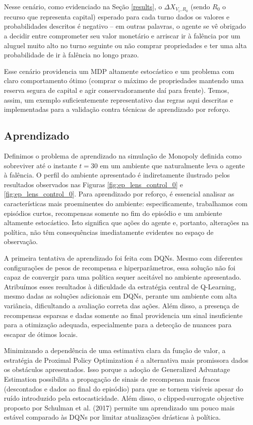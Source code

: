 \documentclass[conference]{IEEEtran}
\begin{document}
Nesse cenário, como evidenciado na Seção \ref{results}, o $\Delta X_{V_1,R_0}$ (sendo $R_0$ o recurso que representa capital) esperado para cada turno dados os valores e probabilidades descritos é negativo -- em outras palavras, o agente se vê obrigado a decidir entre comprometer seu valor monetário e arriscar ir à falência por um aluguel muito alto no turno seguinte ou não comprar propriedades e ter uma alta probabilidade de ir à falência no longo prazo.

Esse cenário providencia um MDP altamente estocástico e um problema com claro comportamento ótimo (comprar o máximo de propriedades mantendo uma reserva segura de capital e agir conservadoramente daí para frente). Temos, assim, um exemplo suficientemente representativo das regras aqui descritas e implementadas para a validação contra técnicas de aprendizado por reforço.

\subsection{Aprendizado}
\label{learning}
Definimos o problema de aprendizado na simulação de Monopoly definida como sobreviver até o instante $t=30$ em um ambiente que naturalmente leva o agente à falência. O perfil do ambiente apresentado é indiretamente ilustrado pelos resultados observados nas Figuras \ref{fig:ep_lens_control_0} e \ref{fig:ep_lens_control_0}. Para aprendizado por reforço, é essencial analisar as características mais proeminentes do ambiente: especificamente, trabalhamos com episódios curtos, recompensas somente no fim do episódio e um ambiente altamente estocástico. Isto significa que ações do agente e, portanto, alterações na política, não têm consequências imediatamente evidentes no espaço de observação.

A primeira tentativa de aprendizado foi feita com DQNs\cite{dqn}. Mesmo com diferentes configurações de pesos de recompensa e hiperparâmetros, essa solução não foi capaz de convergir para uma política sequer aceitável no ambiente apresentado. Atribuímos esses resultados à dificuldade da estratégia central de Q-Learning, mesmo dadas as soluções adicionais em DQNs, perante um ambiente com alta variância, dificultando a avaliação correta das ações. Além disso, a presença de recompensas esparsas e dadas somente ao final providencia um sinal insuficiente para a otimização adequada, especialmente para a detecção de nuances para escapar de ótimos locais.

Minimizando a dependência de uma estimativa clara da função de valor, a estratégia de Proximal Policy Optimization\cite{ppo} é a alternativa mais promissora dados os obstáculos apresentados. Isso porque a adoção de Generalized Advantage Estimation possibilita a propagação de sinais de recompensa mais fracos (descontados e dados ao final do episódio) para que se tornem visíveis apesar do ruído introduzido pela estocasticidade. Além disso, o clipped-surrogate objective proposto por Schulman et al. (2017) permite um aprendizado um pouco mais estável comparado às DQNs por limitar atualizações drásticas à política.
\end{document}
